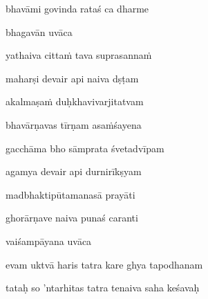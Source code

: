 \nemslokad 
bhavāmi govinda rataś ca dharme \veg\dontdisplaylinenum

\vers

bhagavān uvāca~{\dandab}\dontdisplaylinenum 

\nemsloka 
yathaiva citta\.m tava suprasanna\.m
\dontdisplaylinenum

\nemslokab 
maharṣi devair api naiva dṣṭam \danda\dontdisplaylinenum

\nemslokac 
akalmaṣa\.m duḥkhavivarjitatvam
\dontdisplaylinenum

\nemslokad 
bhavārṇavas tīrṇam asa\.mśayena \veg\dontdisplaylinenum

\ujvers\nemsloka 
gacchāma bho sāmprata śvetadvīpam
\dontdisplaylinenum

\nemslokab 
agamya devair api durnirīkṣyam \danda\dontdisplaylinenum

\nemslokac 
madbhaktipūtamanasā prayāti
\dontdisplaylinenum

\nemslokad 
ghorārṇave naiva punaś caranti \veg\dontdisplaylinenum

\vers

vaiśampāyana uvāca~{\dandab}\dontdisplaylinenum 

evam uktvā haris tatra kare ghya tapodhanam\thinspace{\danda} \dontdisplaylinenum

tataḥ so 'ntarhitas tatra tenaiva saha keśavaḥ \veg\dontdisplaylinenum

